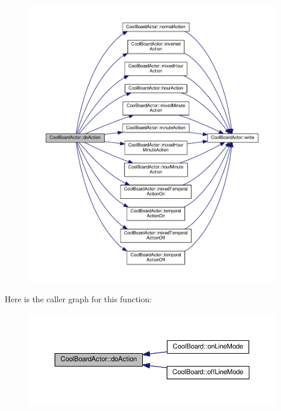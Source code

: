 \begin{figure}[H]
\begin{center}
\leavevmode
\includegraphics[width=350pt]{dc/d69/class_cool_board_actor_a96a45658d32c6b95caa2f385c7da32cd_cgraph}
\end{center}
\end{figure}
Here is the caller graph for this function\+:
\nopagebreak
\begin{figure}[H]
\begin{center}
\leavevmode
\includegraphics[width=350pt]{dc/d69/class_cool_board_actor_a96a45658d32c6b95caa2f385c7da32cd_icgraph}
\end{center}
\end{figure}
\mbox{\label{class_cool_board_actor_adf3b4e15b9d73681082112adf8ef95cb}} 
